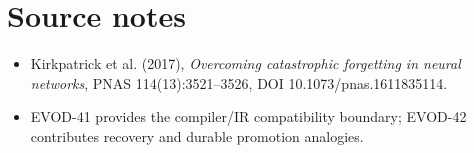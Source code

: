 \chapter*{Source notes}
\begin{itemize}\item Kirkpatrick et al. (2017), \emph{Overcoming catastrophic forgetting in neural networks}, PNAS 114(13):3521--3526, DOI 10.1073/pnas.1611835114.\item EVOD-41 provides the compiler/IR compatibility boundary; EVOD-42 contributes recovery and durable promotion analogies.\end{itemize}

